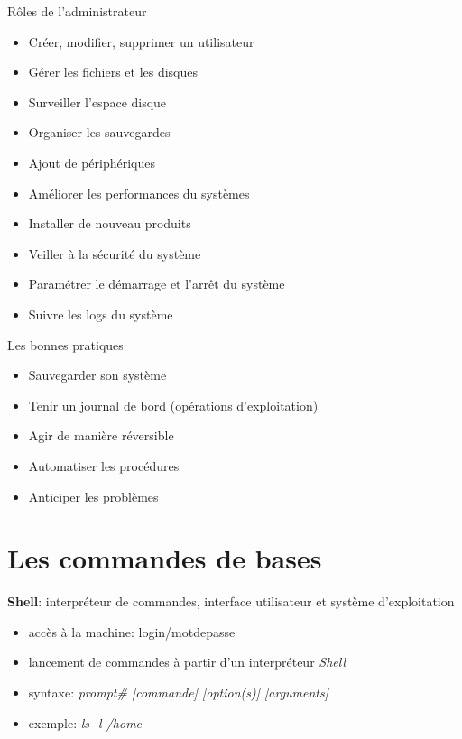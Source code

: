 \documentclass[french]{beamer}
\begin{document}
\begin{frame}
Rôles de l'administrateur
\begin{itemize}
\item Créer, modifier, supprimer un utilisateur
\item Gérer les fichiers et les disques
\item Surveiller l'espace disque
\item Organiser les sauvegardes
\item Ajout de périphériques
\item Améliorer les performances du systèmes
\item Installer de nouveau produits
\item Veiller à la sécurité du système
\item Paramétrer le démarrage et l'arrêt du système
\item Suivre les logs du système
\end{itemize}
\end{frame}

\begin{frame}
Les bonnes pratiques
\begin{itemize}
\item Sauvegarder son système
\item Tenir un journal de bord (opérations d'exploitation)
\item Agir de manière réversible
\item Automatiser les procédures
\item Anticiper les problèmes
\end{itemize}
\end{frame}

\section{Les commandes de bases} 
\frame{\tableofcontents[current]}

\begin{frame}
\textbf{Shell}: interpréteur de commandes, interface utilisateur et système
d'exploitation
    \begin{itemize}
    \item accès à la machine: login/motdepasse 
    \item lancement de commandes à partir d'un interpréteur \textit{Shell}
    \item syntaxe: \textit{prompt\# [commande] [option(s)] [arguments]}
    \item exemple: \textit{ls -l /home}
    \end{itemize}
\end{frame}
\end{document}
